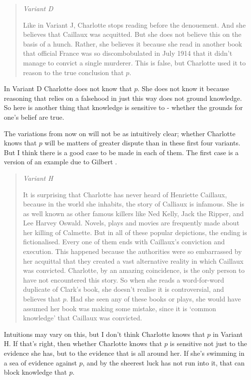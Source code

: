 \documentclass[11pt,]{book}
\begin{document}
\begin{quote}
\emph{Variant D}

Like in Variant J, Charlotte stops reading before the denouement. And she believes that Caillaux was acquitted. But she does not believe this on the basis of a hunch. Rather, she believes it because she read in another book that official France was so discombobulated in July 1914 that it didn't manage to convict a single murderer. This is false, but Charlotte used it to reason to the true conclusion that \(p\).
\end{quote}

In Variant D Charlotte does not know that \(p\). She does not know it because reasoning that relies on a falsehood in just this way does not ground knowledge. So here is another thing that knowledge is sensitive to - whether the grounds for one's belief are true.

The variations from now on will not be as intuitively clear; whether Charlotte knows that \(p\) will be matters of greater dispute than in these first four variants. But I think there is a good case to be made in each of them. The first case is a version of an example due to Gilbert \citet[143ff]{Harman1973}.

\begin{quote}
\emph{Variant H}

It is surprising that Charlotte has never heard of Henriette Caillaux, because in the world she inhabits, the story of Calliaux is infamous. She is as well known as other famous killers like Ned Kelly, Jack the Ripper, and Lee Harvey Oswald. Novels, plays and movies are frequently made about her killing of Calmette. But in all of these popular depictions, the ending is fictionalised. Every one of them ends with Caillaux's conviction and execution. This happened because the authorities were so embarrassed by her acquittal that they created a vast alternative reality in which Caillaux was convicted. Charlotte, by an amazing coincidence, is the only person to have not encountered this story. So when she reads a word-for-word duplicate of Clark's book, she doesn't realise it is controversial, and believes that \(p\). Had she seen any of these books or plays, she would have assumed her book was making some mistake, since it is `common knowledge' that Caillaux was convicted.
\end{quote}

Intuitions may vary on this, but I don't think Charlotte knows that \(p\) in Variant H. If that's right, then whether Charlotte knows that \(p\) is sensitive not just to the evidence she has, but to the evidence that is all around her. If she's swimming in a sea of evidence against \(p\), and by the sheerest luck has not run into it, that can block knowledge that \(p\).
\end{document}
